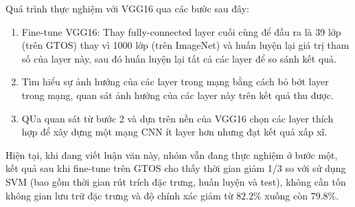 Quá trình thực nghiệm với VGG16 qua các bước sau đây:
\begin{enumerate}
\item Fine-tune VGG16: Thay fully-connected layer cuối cùng để đầu ra là 39 lớp (trên GTOS) thay vì 1000 lớp (trên ImageNet) và huấn luyện lại giá trị tham số của layer này, sau đó huấn luyện lại tất cả các layer để so sánh kết quả.
\item Tìm hiểu sự ảnh hưởng của các layer trong mạng bằng cách bỏ bớt layer trong mạng, quan sát ảnh hưởng của các layer này trên kết quả thu được.
\item QUa quan sát từ bước 2 và dựa trên nền của VGG16 chọn các layer thích hợp để xây dựng một mạng CNN ít layer hơn nhưng đạt kết quả xấp xĩ.
\end{enumerate}

Hiện tại, khi đang viết luận văn này, nhóm vẫn đang thực nghiệm ở bước một, kết quả sau khi fine-tune trên GTOS cho thấy thời gian giảm 1/3 so với sử dụng SVM (bao gồm thời gian rút trích đặc trưng, huấn luyện và test), không cần tốn không gian lưu trữ đặc trưng và độ chính xác giảm từ $82.2\%$ xuống còn $79.8\%$.

